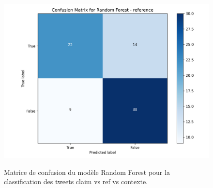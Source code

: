 \begin{figure}[h]
    \begin{minipage}[b]{0.45\textwidth}
        \centering
        \includegraphics[width=\textwidth]{images/confusion_3.json-Random Forest_reference_confusion_matrix}
        \label{fig:confusion_3_3}
    \end{minipage}
    \caption{Matrice de confusion du modèle Random Forest pour la classification des tweets claim vs ref vs contexte.}
    \label{fig:confusion_3}
\end{figure}